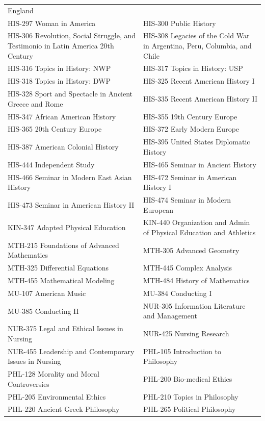 \documentclass[
  letterpaper,
]{scrbook}
\begin{document}
{\begin{longtable}[]{@{}
  >{\raggedright\arraybackslash}p{}
  >{\raggedright\arraybackslash}p{}@{}}
England \\
HIS-297 Woman in America & HIS-300 Public History \\
HIS-306 Revolution, Social Struggle, and Testimonio in Latin America
20th Century & HIS-308 Legacies of the Cold War in Argentina, Peru,
Columbia, and Chile \\
HIS-316 Topics in History: NWP & HIS-317 Topics in History: USP \\
HIS-318 Topics in History: DWP & HIS-325 Recent American History I \\
HIS-328 Sport and Spectacle in Ancient Greece and Rome & HIS-335 Recent
American History II \\
HIS-347 African American History & HIS-355 19th Century Europe \\
HIS-365 20th Century Europe & HIS-372 Early Modern Europe \\
HIS-387 American Colonial History & HIS-395 United States Diplomatic
History \\
HIS-444 Independent Study & HIS-465 Seminar in Ancient History \\
HIS-466 Seminar in Modern East Asian History & HIS-472 Seminar in
American History I \\
HIS-473 Seminar in American History II & HIS-474 Seminar in Modern
European \\
KIN-347 Adapted Physical Education & KIN-440 Organization and Admin of
Physical Education and Athletics \\
MTH-215 Foundations of Advanced Mathematics & MTH-305 Advanced
Geometry \\
MTH-325 Differential Equations & MTH-445 Complex Analysis \\
MTH-455 Mathematical Modeling & MTH-484 History of Mathematics \\
MU-107 American Music & MU-384 Conducting I \\
MU-385 Conducting II & NUR-305 Information Literature and Management \\
NUR-375 Legal and Ethical Issues in Nursing & NUR-425 Nursing
Research \\
NUR-455 Leadership and Contemporary Issues in Nursing & PHL-105
Introduction to Philosophy \\
PHL-128 Morality and Moral Controversies & PHL-200 Bio-medical Ethics \\
PHL-205 Environmental Ethics & PHL-210 Topics in Philosophy \\
PHL-220 Ancient Greek Philosophy & PHL-265 Political Philosophy \\

\end{longtable}}
\end{document}
